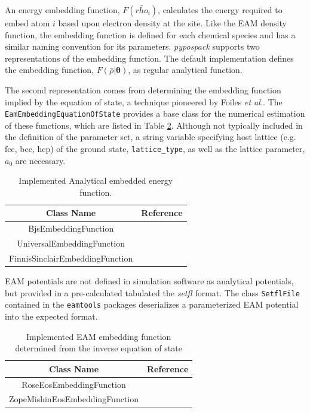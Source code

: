 An energy embedding function, $F(\bar{rho}_i)$, calculates the energy required to embed atom $i$ based upon electron density at the site.  Like the EAM density function, the embedding function is defined for each chemical species and has a similar naming convention for its parameters.
\emph{pypospack} supports two representations of the embedding function.
The default implementation defines the embedding function, $F(\bar{\rho}|\bm{\theta})$, as regular analytical function.

The second representation comes from determining the embedding function implied by the equation of state, a technique pioneered by Foiles \emph{et al.}\cite{foiles1986_eam_embedded_eos}.
The \verb|EamEmbeddingEquationOfState| provides a base class for the numerical estimation of these functions, which are listed in Table \ref{tbl:pypospack_eos_embedding_function}.
Although not typically included in the definition of the parameter set, a string variable specifying host lattice (e.g. fcc, bcc, hcp) of the ground state, \verb|lattice_type|, as well as the lattice parameter, $a_0$ are necessary.

\begin{table}[ht]
	\centering
	\caption{Implemented Analytical embedded energy function.}
	\label{tbl:pypospack_embedding_function}
	\begin{tabular}{cc}
		\hline
		{Class Name} & Reference \\
		\hline
		BjsEmbeddingFunction & \cite{banerjea1988_bjs_embed}\\
		UniversalEmbeddingFunction &
				\cite{johnson1989_eam_embedded}\\
		FinnisSinclairEmbeddingFunction &
				\cite{finnis1984_fs}\\
		\hline
	\end{tabular}
\end{table}

EAM potentials are not defined in simulation software as analytical potentials, but provided in a pre-calculated tabulated the \emph{setfl} format.  The class \verb|SetflFile| contained in the \verb|eamtools| packages deserializes a parameterized EAM potential into the expected format.

\begin{table}[ht]
	\centering
	\caption{Implemented EAM embedding function determined from the inverse equation of state}
	\label{tbl:pypospack_eos_embedding_function}
	\begin{tabular}{cc}
		\hline
		{Class Name} & {Reference} \\
		\hline
		RoseEosEmbeddingFunction &
				\cite{foiles1986_eam_embedded_eos} \\
		ZopeMishinEosEmbeddingFunction &
				\cite{mishin2004_eam_NiAl} \\
		\hline
	\end{tabular}
\end{table}

